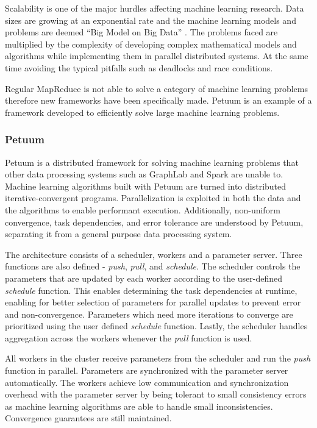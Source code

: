 \documentclass[12pt]{article}
\begin{document}
Scalability is one of the major hurdles affecting machine learning research. Data sizes are growing at an exponential rate and the machine learning models and problems are deemed ``Big Model on Big Data'' \cite{xing2015petuum}. The problems faced are multiplied by the complexity of developing complex mathematical models and algorithms while implementing them in parallel distributed systems. At the same time avoiding the typical pitfalls such as deadlocks and race conditions.

Regular MapReduce is not able to solve a category of machine learning problems therefore new frameworks have been specifically made. Petuum \cite{xing2015petuum} is an example of a framework developed to efficiently solve large machine learning problems.



\subsubsection{Petuum}

Petuum \cite{xing2015petuum} is a distributed framework for solving machine learning problems that other data processing systems such as GraphLab \cite{low2012graphlab} and Spark \cite{zaharia2010spark} are unable to. Machine learning algorithms built with Petuum are turned into distributed iterative-convergent programs. Parallelization is exploited in both the data and the algorithms to enable performant execution. Additionally, non-uniform convergence, task dependencies, and error tolerance are understood by Petuum, separating it from a general purpose data processing system.

The architecture consists of a scheduler, workers and a parameter server. Three functions are also defined - \textit{push}, \textit{pull}, and \textit{schedule}. The scheduler controls the parameters that are updated by each worker according to the user-defined \textit{schedule} function. This enables determining the task dependencies at runtime, enabling for better selection of parameters for parallel updates to prevent error and non-convergence. Parameters which need more iterations to converge are prioritized using the user defined \textit{schedule} function. Lastly, the scheduler handles aggregation across the workers whenever the \textit{pull} function is used.

All workers in the cluster receive parameters from the scheduler and run the \textit{push} function in parallel. Parameters are synchronized with the parameter server automatically. The workers achieve low communication and synchronization overhead with the parameter server by being tolerant to small consistency errors as machine learning algorithms are able to handle small inconsistencies. Convergence guarantees are still maintained.
\end{document}
